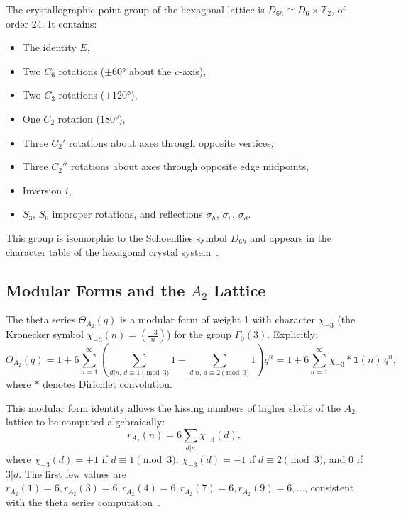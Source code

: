 The crystallographic point group of the hexagonal lattice is
\(D_{6h}\cong D_6\times\mathbb{Z}_2\), of order 24.  It contains:
\begin{itemize}
  \item The identity \(E\),
  \item Two \(C_6\) rotations (\(\pm 60°\) about the \(c\)-axis),
  \item Two \(C_3\) rotations (\(\pm 120°\)),
  \item One \(C_2\) rotation (\(180°\)),
  \item Three \(C_2'\) rotations about axes through opposite vertices,
  \item Three \(C_2''\) rotations about axes through opposite edge midpoints,
  \item Inversion \(i\),
  \item \(S_3\), \(S_6\) improper rotations, and reflections \(\sigma_h\),
        \(\sigma_v\), \(\sigma_d\).
\end{itemize}
This group is isomorphic to the Schoenflies symbol \(D_{6h}\) and appears
in the character table of the hexagonal crystal system~\cite{coxeter_intro_geometry}.

\subsection{Modular Forms and the \(A_2\) Lattice}
\label{subsec:fol-modular}

The theta series \(\Theta_{A_2}(q)\) is a modular form of weight 1 with
character \(\chi_{-3}\) (the Kronecker symbol \(\chi_{-3}(n)=\left(\frac{-3}{n}\right)\))
for the group \(\Gamma_0(3)\).  Explicitly:
\[
  \Theta_{A_2}(q) = 1 + 6\sum_{n=1}^{\infty}\left(
    \sum_{d|n,\,d\equiv 1\pmod 3}1 - \sum_{d|n,\,d\equiv 2\pmod 3}1\right)q^n
  = 1 + 6\sum_{n=1}^{\infty}\chi_{-3}*\mathbf{1}(n)\,q^n,
\]
where \(*\) denotes Dirichlet convolution.

This modular form identity allows the kissing numbers of higher shells
of the \(A_2\) lattice to be computed algebraically:
\[
  r_{A_2}(n) = 6\sum_{d|n}\chi_{-3}(d),
\]
where \(\chi_{-3}(d)=+1\) if \(d\equiv 1\pmod 3\), \(\chi_{-3}(d)=-1\)
if \(d\equiv 2\pmod 3\), and 0 if \(3|d\).  The first few values are
\(r_{A_2}(1)=6, r_{A_2}(3)=6, r_{A_2}(4)=6, r_{A_2}(7)=6, r_{A_2}(9)=6,\ldots\),
consistent with the theta series computation~\cite{conway_sphere_packings}.

